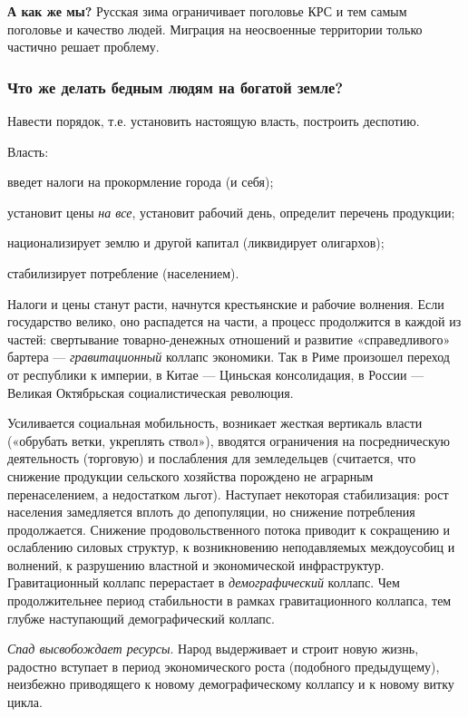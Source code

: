 \textbf{А как же мы?} Русская зима ограничивает поголовье КРС и тем самым поголовье и качество людей. Миграция на
неосвоенные территории только частично решает проблему.

\subsubsection[Что же делать бедным людям на богатой земле?]{Что же делать бедным людям на богатой земле?}

Навести порядок, т.е. установить настоящую власть, построить деспотию.


Власть:


введет налоги на прокормление города (и себя);


установит цены \textit{на все}, установит рабочий день, определит перечень продукции;


национализирует землю и другой капитал (ликвидирует олигархов);


стабилизирует потребление (населением).


Налоги и цены станут расти, начнутся крестьянские и рабочие волнения. Если государство велико, оно распадется на части,
а процесс продолжится в каждой из частей: свертывание товарно-денежных отношений и развитие «справедливого» бартера —
\textit{гравитационный} коллапс экономики. Так в Риме произошел переход от республики к империи, в Китае — Циньская
консолидация, в России — Великая Октябрьская социалистическая революция.


Усиливается социальная мобильность, возникает жесткая вертикаль власти («обрубать ветки, укреплять ствол»), вводятся
ограничения на посредническую деятельность (торговую) и послабления для земледельцев (считается, что снижение продукции
сельского хозяйства порождено не аграрным перенаселением, а недостатком льгот). Наступает некоторая стабилизация: рост
населения замедляется вплоть до депопуляции, но снижение потребления продолжается. Снижение продовольственного потока
приводит к сокращению и ослаблению силовых структур, к возникновению неподавляемых междоусобиц и волнений, к разрушению
властной и экономической инфраструктур. Гравитационный коллапс перерастает в \textit{демографический} коллапс. Чем
продолжительнее период стабильности в рамках гравитационного коллапса, тем глубже наступающий демографический коллапс.



\textit{Спад высвобождает ресурсы}. Народ выдерживает и строит новую жизнь, радостно вступает в период
экономического роста (подобного предыдущему), неизбежно приводящего к новому демографическому коллапсу и к новому витку
цикла.

